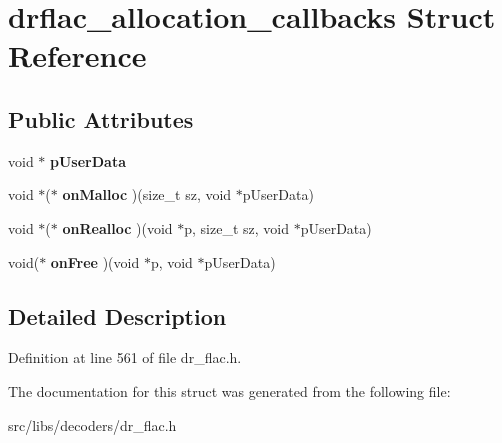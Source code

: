 \hypertarget{structdrflac__allocation__callbacks}{\section{drflac\-\_\-allocation\-\_\-callbacks Struct Reference}
\label{structdrflac__allocation__callbacks}
}
\subsection*{Public Attributes}
\begin{DoxyCompactItemize}
\item 
\hypertarget{structdrflac__allocation__callbacks_a08e314b1622e4b194ee1841ec6dc26b4}{void $\ast$ {\bfseries p\-User\-Data}}\label{structdrflac__allocation__callbacks_a08e314b1622e4b194ee1841ec6dc26b4}

\item 
\hypertarget{structdrflac__allocation__callbacks_af40bc3ff5489482e7b4a02bb12d37711}{void $\ast$($\ast$ {\bfseries on\-Malloc} )(size\-\_\-t sz, void $\ast$p\-User\-Data)}\label{structdrflac__allocation__callbacks_af40bc3ff5489482e7b4a02bb12d37711}

\item 
\hypertarget{structdrflac__allocation__callbacks_a0a276cb6de5dc9f5b4dcba26827fe23b}{void $\ast$($\ast$ {\bfseries on\-Realloc} )(void $\ast$p, size\-\_\-t sz, void $\ast$p\-User\-Data)}\label{structdrflac__allocation__callbacks_a0a276cb6de5dc9f5b4dcba26827fe23b}

\item 
\hypertarget{structdrflac__allocation__callbacks_af3dc8202d36020cfabdd8b52b5fac009}{void($\ast$ {\bfseries on\-Free} )(void $\ast$p, void $\ast$p\-User\-Data)}\label{structdrflac__allocation__callbacks_af3dc8202d36020cfabdd8b52b5fac009}

\end{DoxyCompactItemize}


\subsection{Detailed Description}


Definition at line 561 of file dr\-\_\-flac.\-h.



The documentation for this struct was generated from the following file\-:\begin{DoxyCompactItemize}
\item 
src/libs/decoders/dr\-\_\-flac.\-h\end{DoxyCompactItemize}
